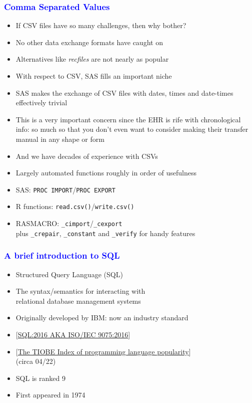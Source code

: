 \documentclass[11pt,pdftex,dvipsnames,usenames]{beamer}
\begin{document}
\begin{frame}[fragile]\frametitle{\bf\textcolor{blue}{Comma Separated Values}}

\begin{itemize}
\item If CSV files have so many challenges, then why bother?
\item No other data exchange formats have caught on
\item Alternatives like {\it recfiles} are not nearly as popular
\item With respect to CSV, SAS fills an important niche
\item SAS makes the exchange of CSV files with dates, times
and date-times effectively trivial
\item This is a very important concern since the EHR is rife
with chronological info: so much so that you don't even want to
consider making their transfer manual in any shape or form
\item And we have decades of experience with CSVs
\item Largely automated functions roughly in order of usefulness
\item SAS: \texttt{PROC IMPORT}/\texttt{PROC EXPORT}
\item R functions: \texttt{read.csv()}/\texttt{write.csv()}
\item RASMACRO: \texttt{\_cimport}/\texttt{\_cexport}\\
plus \texttt{\_crepair}, \texttt{\_constant}
and \texttt{\_verify} for handy features
\end{itemize}

\end{frame}

\begin{frame}[fragile]\frametitle{\bf\textcolor{blue}{A brief introduction to SQL}}

\begin{itemize}
\item Structured Query Language (SQL) 
\item The syntax/semantics for interacting with\\
relational database management systems
\item Originally developed by IBM: now an industry standard
\item \textcolor{PineGreen}{[\href{https://www.iso.org/standard/63555.html}
{SQL:2016 AKA ISO/IEC 9075:2016}]}
\item \textcolor{PineGreen}{[\href{https://www.tiobe.com/tiobe-index}
{The TIOBE Index of programming language popularity}]}\\ (circa 04/22)
\item SQL is ranked 9
\item First appeared in 1974
\end{itemize}

\end{frame}
\end{document}
